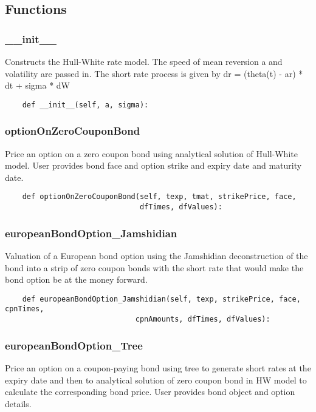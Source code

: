 \documentclass[twoside,11pt]{book}
\begin{document}
\subsection*{Functions}

\subsubsection*{{\bf \_\_init\_\_}}
Constructs the Hull-White rate model. The speed of mean reversion a and volatility are passed in. The short rate process is given by dr = (theta(t) - ar) * dt  + sigma * dW  

\begin{lstlisting}
    def __init__(self, a, sigma):
\end{lstlisting}

\subsubsection*{{\bf optionOnZeroCouponBond}}
Price an option on a zero coupon bond using analytical solution of Hull-White model. User provides bond face and option strike and expiry date and maturity date.  

\begin{lstlisting}
    def optionOnZeroCouponBond(self, texp, tmat, strikePrice, face,
                               dfTimes, dfValues):
\end{lstlisting}

\subsubsection*{{\bf europeanBondOption\_Jamshidian}}
Valuation of a European bond option using the Jamshidian deconstruction of the bond into a strip of zero coupon bonds with the short rate that would make the bond option be at the money forward.  

\begin{lstlisting}
    def europeanBondOption_Jamshidian(self, texp, strikePrice, face, cpnTimes,
                              cpnAmounts, dfTimes, dfValues):
\end{lstlisting}

\subsubsection*{{\bf europeanBondOption\_Tree}}
Price an option on a coupon-paying bond using tree to generate short rates at the expiry date and then to analytical solution of zero coupon bond in HW model to calculate the corresponding bond price. User provides bond object and option details.  
\end{document}
